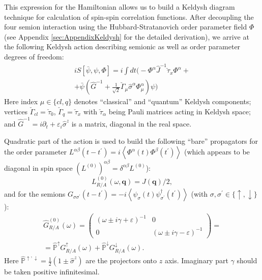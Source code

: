 \documentclass[twocolumn,english,prb]{revtex4-1}
\begin{document}
This expression for the Hamiltonian allows us to build a Keldysh diagram technique for calculation of spin-spin correlation functions. After decoupling the four semion interaction using the Hubbard-Stratanovich order parameter field $\Phi$ (see Appendix \ref{sec:AppendixKeldysh} for the detailed derivation), we arrive at the following Keldysh action describing semionic as well as order parameter degrees of freedom:
\begin{multline}
\label{eq:KeldyshAction}
iS[\bar{\psi},\psi,\Phi]=i\int dt\Big(-\Phi^{\alpha}\hat{J}^{-1}\check{\tau}_{x}\Phi^{\alpha}+\\
+\bar{\psi}\left(\hat{G}^{-1} + \frac{1}{\sqrt{2}}\check{\Gamma}_{\mu}\hat{\sigma}^{\alpha}\Phi_{\mu}^{\alpha}\right)\psi\Big)
\end{multline}
Here index $\mu \in \{cl, q\}$ denotes ``classical'' and ``quantum'' Keldysh components; vertices $\check{\Gamma}_{cl} = \check{\tau}_0$, $\check{\Gamma}_{q} = \check{\tau}_x$ with $\check{\tau}_\alpha$ being Pauli matrices acting in Keldysh space; and $\hat{G}^{-1} = i \partial_t + \varepsilon_i \hat{\sigma}^z$ is a matrix, diagonal in the real space.

Quadratic part of the action is used to build the following ``bare'' propagators for the order parameter
 $L^{\alpha \beta}(t-t^\prime) = i \left\langle \Phi^\alpha(t) \Phi^\beta(t^\prime)\right\rangle$ 
(which appears to be diagonal in
 spin space $(L^{(0)})^{\alpha \beta}  = \delta^{\alpha \beta} L^{(0)}$):
\begin{equation}
\label{eq:OrderBarePropagator}
L_{R/A}^{(0)}(\omega, \boldsymbol{q}) = J(\boldsymbol{q})/2,
\end{equation}
and for the semions $G_{\sigma \sigma^\prime}(t-t^\prime) = -i \left\langle\psi_\sigma(t) \psi^\dagger_{\sigma^\prime}(t^\prime)\right\rangle$ (with $\sigma,\sigma^\prime \in \{\uparrow, \downarrow\}$):
\begin{multline}
\label{eq:SemionBarePropagator}
\hat{G}^{(0)}_{R/A}(\omega)=\begin{pmatrix}(\omega\pm i\gamma+\varepsilon)^{-1} & 0\\
0 & (\omega\pm i\gamma-\varepsilon)^{-1}
\end{pmatrix}=\\
=\hat{\mathbb{P}}^{\uparrow}G_{R/A}^{\uparrow}(\omega)+\hat{\mathbb{P}}^{\downarrow}G_{R/A}^{\downarrow}(\omega).
\end{multline}
Here $\hat{\mathbb{P}}^{\uparrow,\downarrow} = \frac{1}{2} (1 \pm \hat{\sigma}^z)$ are the projectors onto $z$ axis.  Imaginary part $\gamma$ should be taken positive infinitesimal.
\end{document}
